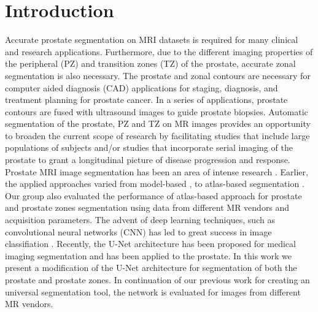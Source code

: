 \section{Introduction}
\label{sec:intro}
Accurate prostate segmentation on MRI datasets is required for many clinical and research 
applications. Furthermore, due to the different imaging properties of the peripheral (PZ) 
and transition zones (TZ) of the prostate, accurate zonal segmentation is also necessary. 
The prostate and zonal contours are necessary for computer aided diagnosis (CAD)
applications for staging, diagnosis, and treatment planning for prostate cancer. In 
a series of applications, prostate contours are fused with ultrasound images to
guide prostate biopsies. Automatic segmentation of the prostate, PZ and TZ on MR 
images provides an opportunity to broaden the current scope of research by facilitating 
studies that include large populations of subjects and/or studies that incorporate 
serial imaging of the prostate to grant a longitudinal picture of disease 
progression and response.  
Prostate MRI image segmentation has been an area of intense research \cite{litjens2014evaluation}. Earlier, the 
applied approaches varied from model-based \cite{chowdhury2012concurrent,toth2012multifeature},
 to atlas-based segmentation
\cite{4_klein2008automatic, 8_korsager2015use, 9_chilali2016gland}.
 Our group also evaluated the performance of atlas-based approach for prostate and prostate zones 
segmentation using data from different MR vendors and acquisition parameters\cite{10_padgett2018towards}. The advent 
of deep learning techniques, such as convolutional neural networks (CNN) has led to great success 
in image classifiation \cite{11_krizhevsky2012imagenet,12_simonyan2011immediate}. Recently, 
the U-Net architecture has been proposed \cite{13_ronneberger2015u} for medical imaging 
segmentation and has been applied to the prostate\cite{14_meyer2018automatic}.
In this work we present a modification of the U-Net architecture for segmentation of both 
the prostate and prostate zones. In continuation of our previous work for creating an 
universal segmentation tool, the network is evaluated for images from different MR vendors.  
